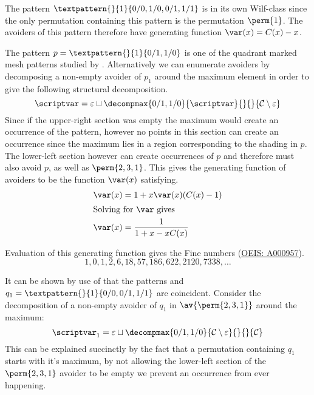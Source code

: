 The pattern \(\textpattern{}{1}{0/0,1/0,0/1,1/1}\) is in its own
Wilf-class since the only permutation containing this pattern is
the permutation \(\perm{1}\). The avoiders of this pattern therefore
have generating function \(\var(x) = C(x)-x\).

\nextvar
The pattern \(p = \textpattern{}{1}{0/1,1/0}\) is one of the
quadrant marked mesh patterns studied by \textcite{2012arXiv1201.6243K}.
Alternatively we can enumerate
avoiders by decomposing a non-empty avoider of \(p_1\) around the maximum element
in order to give the following structural decomposition.
\begin{equation*}
    \scriptvar = \varepsilon \sqcup \decompmax{0/1,1/0}{\scriptvar}{}{}{\mathcal{C}\setminus\varepsilon}
\end{equation*}
Since if the upper-right section was empty the maximum would create an
occurrence of the pattern, however no points in this section can create
an occurrence since the maximum lies in a region corresponding to the
shading in \(p\). The lower-left section however can create occurrences
of \(p\) and therefore must also avoid \(p\), as well as \(\perm{2,3,1}\).
This gives the generating function of avoiders to be the function \(\var(x)\)
satisfying.
\begin{align*}
    \var(x) &= 1 + x\var(x)(C(x)-1) \\
    \shortintertext{Solving for \(\var\) gives}
    \var(x) &= \frac{1}{1+x-xC(x)}
\end{align*}

Evaluation of this generating function gives the Fine numbers
(\href{https://oeis.org/A000957}{OEIS: A000957}).
\begin{equation*}
    1, 0, 1, 2, 6, 18, 57, 186, 622, 2120, 7338,\dotsc
\end{equation*}


\nextvar[\varfine]
It can be shown by use of  that the patterns
 and \(q_1 = \textpattern{}{1}{0/0,0/1,1/1}\) are
coincident. Consider the decomposition of a non-empty avoider of \(q_1\) in
\(\av{\perm{2,3,1}}\) around the maximum:
\begin{equation*}
    \scriptvar_1 =\varepsilon \sqcup \decompmax{0/1,1/0}{\mathcal{C}\setminus\varepsilon}{}{}{\mathcal{C}}
\end{equation*}
This can be explained succinctly by the fact that a permutation containing
\(q_1\) starts with it's maximum, by not allowing the lower-left section of the
\(\perm{2,3,1}\) avoider to be empty we prevent an occurrence from ever happening.

